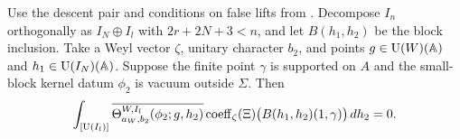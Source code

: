 \begin{lemma}
\label{lem:c-false-kernel-period}
\emitthmsource
Use the descent pair and conditions on false lifts from . Decompose $I_n$ orthogonally as $I_N\oplus I_l$ with $2r+2N+3<n$, and let $B(h_1,h_2)$ be the block inclusion. Take a Weyl vector $\zeta$, unitary character $b_2$, and points $g\in \operatorname{U}(W)(\mathbb A)$ and $h_1\in \operatorname{U}(I_N)(\mathbb A)$. Suppose the finite point $\gamma$ is supported on $A$ and the small-block kernel datum $\phi_2$ is vacuum outside $\Sigma$. Then
\[
 \int_{[\operatorname{U}(I_l)]} \overline{\Theta^{W,I_l}_{a_W,b_2}(\phi_2;g,h_2)}
    \operatorname{coeff}_\zeta(\Xi)\bigl(B(h_1,h_2)(1,\gamma)\bigr)\,dh_2=0 .
\]
\end{lemma}

